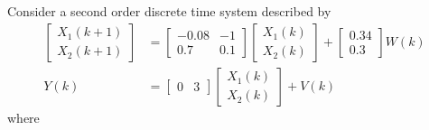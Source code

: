 \item
Consider a second order discrete time system described by
\begin{align*}
    \begin{bmatrix}
            X_1(k+1) \\
            X_2(k+1)
        \end{bmatrix} & = \begin{bmatrix}
            -0.08 & -1 \\
            0.7 & 0.1
        \end{bmatrix} \begin{bmatrix}
            X_1(k) \\
            X_2(k)
        \end{bmatrix} + \begin{bmatrix}
            0.34 \\
            0.3
        \end{bmatrix} W(k) \\
    Y(k) & = \begin{bmatrix}
            0 & 3
        \end{bmatrix} \begin{bmatrix}
            X_1(k) \\
            X_2(k)
        \end{bmatrix} + V(k)
\end{align*}
where
